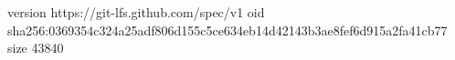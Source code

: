 version https://git-lfs.github.com/spec/v1
oid sha256:0369354c324a25adf806d155c5ce634eb14d42143b3ae8fef6d915a2fa41cb77
size 43840
